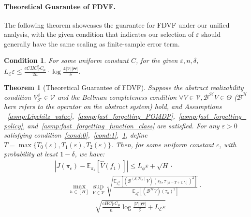 \documentclass[twoside]{article}
\newtheorem{theorem}{Theorem}
\newtheorem{condition}{Condition}
\newcommand{\CAL}[1]{\mathcal{#1}}
\newcommand{\yplu}[1]{{\color{orange}{ [\textbf{Yiping:}} #1]}}
\begin{document}
\paragraph{Theoretical Guarantee of FDVF.}

The following theorem showcases the guarantee for FDVF under our unified analysis, with the given condition that indicates our selection of $\varepsilon$ should generally have the same scaling as finite-sample error term.
\begin{condition}\label{cond:2}
    For some uniform constant $C$, for the given $\varepsilon,n,\delta$, $L_{\CAL{E}}\varepsilon\leq \frac{eCHC_{\CAL{V}}^2C_\mu}{2n}\cdot\log\frac{4|\CAL{V}||\Theta|}{\delta}$.
\end{condition}

\begin{theorem}[Theoretical Guarantee of FDVF]\label{Thm:finite_sample_FDVF}
Suppose the abstract realizability condition $V_\CAL{F}^\phi \in \CAL{V}$ and the Bellman completeness condition $\forall V \in \CAL{V}, \CAL{B^H}V \in \Theta$ ($\CAL{B^H}$ here refers to the operator on the abstract system) hold, and Assumptions%
~\ref{asmp:Lipchitz_value},~\ref{asmp:fast_forgetting_POMDP},~\ref{asmp:fast_forgetting_policy}, and~\ref{asmp:fast_forgetting_function_class} are satisfied. For any $\varepsilon > 0$ satisfying condition~\ref{cond:0},~\ref{cond:1},~\ref{cond:2}, define $T=\max\{T_0(\varepsilon),T_1(\varepsilon),T_2(\varepsilon)\}$.
Then, for some uniform constant $c$, with probability at least $1 - \delta$, we have: 
\begingroup
\allowdisplaybreaks
\begin{align*}
&|J(\pi_e)-\mathbb{E}_{\pi_b}[\hat{V}(f_1)]|\leq L_\phi\varepsilon+\sqrt{H} \cdot \nonumber\\&\textstyle\qquad\max_{h\in[H]}\sup_{V\in\CAL{V}}\sqrt{\frac{\mathbb{E}_{\pi_e^\phi}[(\CAL{B}^{(\CAL{S},\CAL{H}_T)}V)(s_h,\tau_{[h-T+1:h]})^2]}{\mathbb{E}_{\pi_b^\phi}[(\CAL{B^H}V)(\tau_h)^2]}}\cdot\nonumber\\&\textstyle\qquad\qquad\qquad\sqrt{\frac{cHC_{\CAL{V}}^2C_\mu}{n}\log\frac{|\CAL{V}||{\Theta}|}{\delta}+L_{\CAL{E}}\varepsilon} 
\end{align*}
\endgroup
\end{theorem}
\end{document}
